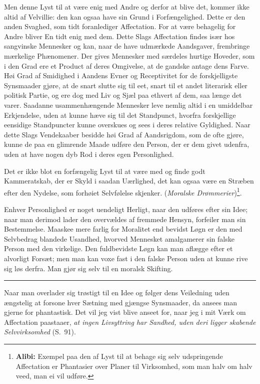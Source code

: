 \documentclass[12pt]{article}
\newcommand{\opage}[1]{\marginnote{\footnotesize\textit{[#1]}}}
\newcommand{\ombreak}{\par\medskip\begin{center}\rule{0.32\textwidth}{0.4pt}\end{center}\medskip}
\begin{document}
\opage{175}Men denne Lyst til at være enig med Andre og derfor at blive det, kommer ikke altid af Velvillie: den kan ogsaa have sin Grund i Forfængelighed. Dette er den anden Svaghed, som tidt foranlediger Affectation. For at være behagelig for Andre bliver En tidt enig med dem. Dette Slags Affectation findes især hos sangvinske Mennesker og kan, naar de have udmærkede Aandsgaver, frembringe mærkelige Phænomener. Der gives Mennesker med særdeles hurtige Hoveder, som i den Grad ere et Product af deres Omgivelse, at de gandske antage dens Farve. Høi Grad af Smidighed i Aandens Evner og Receptivitet for de forskjelligste Synsmaader gjøre, at de snart slutte sig til eet, snart til et andet literarisk eller politisk Partie, og ere dog med Liv og Sjæl paa ethvert af dem, saa længe det varer. Saadanne usammenhængende Mennesker leve nemlig altid i en umiddelbar Erkjendelse, uden at kunne hæve sig til det Standpunct, hvorfra forskjellige eensidige Standpuncter kunne overskues og sees i deres relative Gyldighed. Naar dette Slags Vendekaaber besidde høi Grad af Aandsrigdom, som de ofte gjøre, kunne de paa en glimrende Maade udføre den Person, der er dem givet udenfra, uden at have nogen dyb Rod i deres egen Personlighed.

Det er ikke blot en forfængelig Lyst til at være med og finde godt Kammeratskab, der er Skyld i saadan Uærlighed, det kan ogsaa være en Stræben efter den Nydelse, som forhøiet Selvfølelse skjenker. (\emph{Moralske Drømmerier})\footnote{\textbf{Alibi:} Exempel paa den af Lyst til at behage sig selv udspringende Affectation er Phantasier over Planer til Virksomhed, som man halv om halv veed, man ei vil udføre.}.

Enhver Personlighed er noget uendeligt Herligt, naar den udføres efter sin Idee; naar man derimod lader den overvældes af fremmede Hensyn, forfeiler man sin Bestemmelse. Maaskee \opage{176}mere farlig for Moralitet end bevidst Løgn er den med Selvbedrag blandede Usandhed, hvorved Mennesket amalgamerer sin falske Person med den virkelige. Den fuldbevidste Løgn kan man aflægge efter et alvorligt Forsæt; men man kan voxe fast i den falske Person uden at kunne rive sig løs derfra. Man gjør sig selv til en moralsk Skifting.

\ombreak

Naar man overlader sig trøstigt til en Idee og følger dens Veiledning uden ængstelig at forsone hver Sætning med gjængse Synsmaader, da ansees man gjerne for phantastisk. Det vil jeg vist blive anseet for, naar jeg i mit Værk om Affectation paastaaer, \emph{at ingen Livsyttring har Sandhed, uden deri ligger skabende Selvvirksomhed} (S.\ 91).
\end{document}
